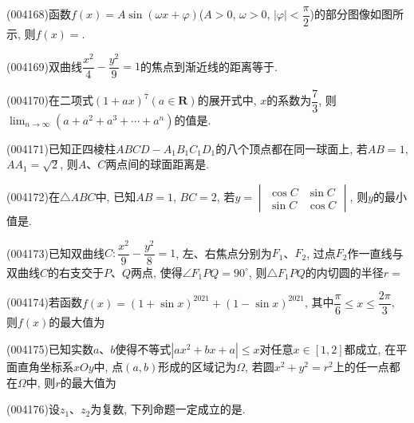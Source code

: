 \item (004168)函数$f(x)=A\sin (\omega x+\varphi)$($A>0$, $\omega>0$, $|\varphi|<\dfrac{\pi}2$)的部分图像如图所示, 则$f(x)=$.
\begin{center}
\end{center}
\item (004169)双曲线$\dfrac{x^2}4-\dfrac{y^2}9=1$的焦点到渐近线的距离等于.
\item (004170)在二项式$(1+ax)^7(a\in \mathbf{R})$的展开式中, $x$的系数为$\dfrac 73$, 则$\displaystyle\lim_{n\to \infty}(a+a^2+a^3+\cdots +a^n)$的值是.
\item (004171)已知正四棱柱$ABCD-A_1B_1C_1D_1$的八个顶点都在同一球面上, 若$AB=1$, $AA_1=\sqrt 2$, 则$A$、$C$两点间的球面距离是.
\item (004172)在$\triangle ABC$中, 已知$AB=1$, $BC=2$, 若$y=\begin{vmatrix}
\cos C & \sin C  \\ \sin C  & \cos C  \end{vmatrix}$, 则$y$的最小值是.
\item (004173)已知双曲线$C:\dfrac{x^2}9-\dfrac{y^2}8=1$, 左、右焦点分别为$F_1$、$F_2$, 过点$F_2$作一直线与双曲线$C$的右支交于$P$、$Q$两点, 使得$\angle {F_1}PQ=90^\circ$, 则$\triangle {F_1}PQ$的内切圆的半径$r=$
\item (004174)若函数$f(x)={(1+\sin x)}^{2021}+{(1-\sin x)}^{2021}$, 其中$\dfrac{\pi }6\le x\le \dfrac{2\pi }3$, 则$f(x)$的最大值为
\item (004175)已知实数$a$、$b$使得不等式$|ax^2+bx+a|\le x$对任意$x\in [1,2]$都成立, 在平面直角坐标系$xOy$中, 点$(a,b)$形成的区域记为$\Omega$, 若圆$x^2+y^2=r^2$上的任一点都在$\Omega$中, 则$r$的最大值为
\item (004176)设$z_1$、$z_2$为复数, 下列命题一定成立的是.
